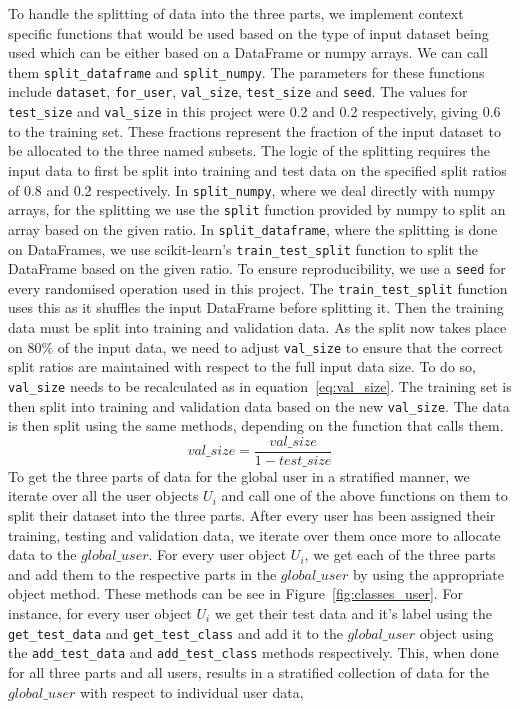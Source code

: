 \documentclass[12pt]{article}
\begin{document}
To handle the splitting of data into the three parts, we implement context specific functions that would be used based on the type of input dataset being used which can be either based on a DataFrame or numpy arrays. We can call them \texttt{split\_dataframe} and \texttt{split\_numpy}. The parameters for these functions include \texttt{dataset}, \texttt{for\_user}, \texttt{val\_size}, \texttt{test\_size} and \texttt{seed}. The values for \texttt{test\_size} and \texttt{val\_size} in this project were 0.2 and 0.2 respectively, giving 0.6 to the training set. These fractions represent the fraction of the input dataset to be allocated to the three named subsets. The logic of the splitting requires the input data to first be split into training and test data on the specified split ratios of 0.8 and 0.2 respectively. In \texttt{split\_numpy}, where we deal directly with numpy arrays, for the splitting we use the \texttt{split} function provided by numpy to split an array based on the given ratio. In \texttt{split\_dataframe}, where the splitting is done on DataFrames, we use scikit-learn's \texttt{train\_test\_split} function to split the DataFrame based on the given ratio. To ensure reproducibility, we use a \texttt{seed} for every randomised operation used in this project. The \texttt{train\_test\_split} function uses this as it shuffles the input DataFrame before splitting it. Then the training data must be split into training and validation data. As the split now takes place on 80\% of the input data, we need to adjust \texttt{val\_size} to ensure that the correct split ratios are maintained with respect to the full input data size. To do so, \texttt{val\_size} needs to be recalculated as in equation~\ref{eq:val_size}. The training set is then split into training and validation data based on the new \texttt{val\_size}. The data is then split using the same methods, depending on the function that calls them.
\begin{equation}\label{eq:val_size}
	val\_size = \frac{val\_size}{1-test\_size}
\end{equation}
To get the three parts of data for the global user in a stratified manner, we iterate over all the user objects $U_i$ and call one of the above functions on them to split their dataset into the three parts. After every user has been assigned their training, testing and validation data, we iterate over them once more to allocate data to the $global\_user$. For every user object $U_i$, we get each of the three parts and add them to the respective parts in the $global\_user$ by using the appropriate object method. These methods can be see in Figure~\ref{fig:classes_user}. For instance, for every user object $U_i$ we get their test data and it's label using the \texttt{get\_test\_data} and \texttt{get\_test\_class} and add it to the $global\_user$ object using the \texttt{add\_test\_data} and \texttt{add\_test\_class} methods respectively. This, when done for all three parts and all users, results in a stratified collection of data for the $global\_user$ with respect to individual user data,
\end{document}
